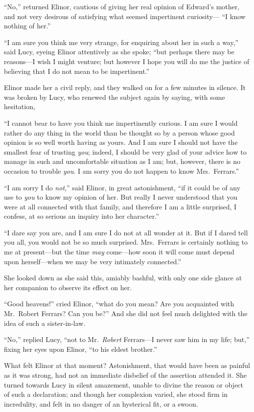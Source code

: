 \documentclass{article}
\begin{document}
``No,'' returned Elinor, cautious of giving her real
opinion of Edward's mother, and not very desirous
of satisfying what seemed impertinent curiosity---%
``I know nothing of her.''

``I am sure you think me very strange, for enquiring
about her in such a way,'' said Lucy, eyeing Elinor attentively
as she spoke; ``but perhaps there may be reasons---I wish
I might venture; but however I hope you will do me the justice
of believing that I do not mean to be impertinent.''

Elinor made her a civil reply, and they walked on
for a few minutes in silence.  It was broken by Lucy,
who renewed the subject again by saying, with some
hesitation,

``I cannot bear to have you think me impertinently curious.
I am sure I would rather do any thing in the world than be
thought so by a person whose good opinion is so well worth
having as yours.  And I am sure I should not have the smallest
fear of trusting \emph{you}; indeed, I should be very glad of your
advice how to manage in such and uncomfortable situation
as I am; but, however, there is no occasion to trouble \emph{you}.
I am sorry you do not happen to know Mrs.\ Ferrars.''

``I am sorry I do \emph{not},'' said Elinor, in great astonishment,
``if it could be of any use to \emph{you} to know my opinion of her.
But really I never understood that you were at all connected
with that family, and therefore I am a little surprised,
I confess, at so serious an inquiry into her character.''

``I dare say you are, and I am sure I do not at all
wonder at it.  But if I dared tell you all, you would not be
so much surprised.  Mrs.\ Ferrars is certainly nothing to me
at present---but the time \emph{may} come---how soon it will come
must depend upon herself---when we may be very intimately
connected.''

She looked down as she said this, amiably bashful,
with only one side glance at her companion to observe its
effect on her.

``Good heavens!'' cried Elinor, ``what do you mean?
Are you acquainted with Mr.\ Robert Ferrars?  Can you be?''
And she did not feel much delighted with the idea of such
a sister-in-law.

``No,'' replied Lucy, ``not to Mr.\ \emph{Robert} Ferrars---I
never saw him in my life; but,'' fixing her eyes upon Elinor,
``to his eldest brother.''

What felt Elinor at that moment? Astonishment,
that would have been as painful as it was strong, had not
an immediate disbelief of the assertion attended it.
She turned towards Lucy in silent amazement, unable to divine
the reason or object of such a declaration; and though
her complexion varied, she stood firm in incredulity,
and felt in no danger of an hysterical fit, or a swoon.
\end{document}
